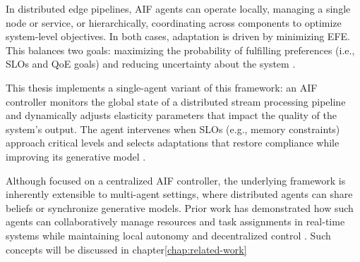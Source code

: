 In distributed edge pipelines, AIF agents can operate locally, managing a single node or service, or hierarchically, coordinating across components to optimize system-level objectives. In both cases, adaptation is driven by minimizing EFE. This balances two goals: maximizing the probability of fulfilling preferences (i.e., SLOs and QoE goals) and reducing uncertainty about the system \cite{friston_free-energy_2010, lanillos_active_2021}. 

This thesis implements a single-agent variant of this framework: an AIF controller monitors the global state of a distributed stream processing pipeline and dynamically adjusts elasticity parameters that impact the quality of the system's output. The agent intervenes when SLOs (e.g., memory constraints) approach critical levels and selects adaptations that restore compliance while improving its generative model \cite{sedlak_equilibrium_2024}.

Although focused on a centralized AIF controller, the underlying framework is inherently extensible to multi-agent settings, where distributed agents can share beliefs or synchronize generative models. Prior work has demonstrated how such agents can collaboratively manage resources and task assignments in real-time systems while maintaining local autonomy and decentralized control \cite{sedlak_slo-aware_2025}. Such concepts will be discussed in chapter\ref{chap:related-work}
